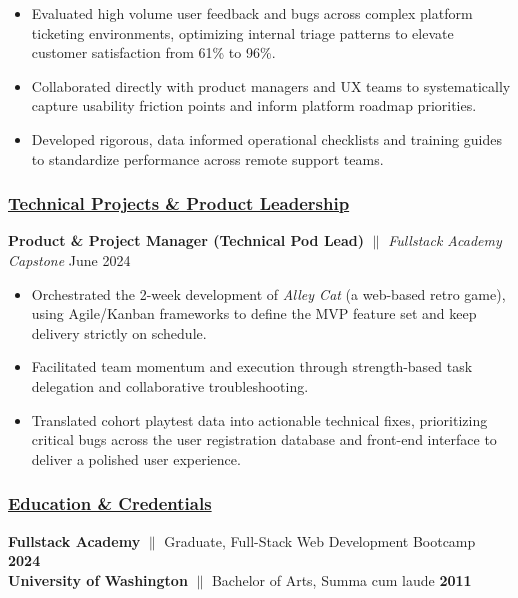 \documentclass[a4paper,10pt]{article}
\begin{document}
\begin{itemize}
      \item Evaluated high volume user feedback and bugs across complex platform ticketing environments, optimizing internal triage patterns to elevate customer satisfaction from 61\% to 96\%.
      \item Collaborated directly with product managers and UX teams to systematically capture usability friction points and inform platform roadmap priorities.
      \item Developed rigorous, data informed operational checklists and training guides to standardize performance across remote support teams.
\end{itemize}

\subsubsection{\underline{Technical Projects \& Product Leadership}}
{\textbf{Product \& Project Manager (Technical Pod Lead)} $\parallel$ \textit{Fullstack Academy Capstone} \hfill {June 2024}}
\begin{itemize}
      \item Orchestrated the 2-week development of \textit{Alley Cat} (a web-based retro game), using Agile/Kanban frameworks to define the MVP feature set and keep delivery strictly on schedule.
      \item Facilitated team momentum and execution through strength-based task delegation and collaborative troubleshooting.
      \item Translated cohort playtest data into actionable technical fixes, prioritizing critical bugs across the user registration database and front-end interface to deliver a polished user experience.
\end{itemize}

\subsubsection{\underline{Education \& Credentials}}
\textbf{Fullstack Academy} $\parallel$ Graduate, Full-Stack Web Development Bootcamp \hfill \textbf{2024} \\
\textbf{University of Washington} $\parallel$ Bachelor of Arts, Summa cum laude \hfill \textbf{2011}
\end{document}
